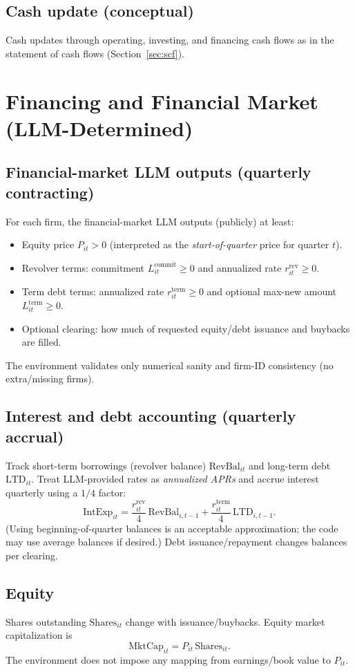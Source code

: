 \documentclass[11pt]{article}
\begin{document}
\subsection{Cash update (conceptual)}
Cash updates through operating, investing, and financing cash flows as in the statement of cash flows (Section~\ref{sec:scf}).

\section{Financing and Financial Market (LLM-Determined)}

\subsection{Financial-market LLM outputs (quarterly contracting)}
For each firm, the financial-market LLM outputs (publicly) at least:
\begin{itemize}[leftmargin=*]
    \item Equity price $P_{it}>0$ (interpreted as the \emph{start-of-quarter} price for quarter $t$).
    \item Revolver terms: commitment $L^{\text{commit}}_{it}\ge 0$ and annualized rate $r^{\text{rev}}_{it}\ge 0$.
    \item Term debt terms: annualized rate $r^{\text{term}}_{it}\ge 0$ and optional max-new amount $L^{\text{term}}_{it}\ge 0$.
    \item Optional clearing: how much of requested equity/debt issuance and buybacks are filled.
\end{itemize}
The environment validates only numerical sanity and firm-ID consistency (no extra/missing firms).

\subsection{Interest and debt accounting (quarterly accrual)}
Track short-term borrowings (revolver balance) $\text{RevBal}_{it}$ and long-term debt $\text{LTD}_{it}$.
Treat LLM-provided rates as \emph{annualized APRs} and accrue interest quarterly using a $1/4$ factor:
\[
\text{IntExp}_{it} = \frac{r^{\text{rev}}_{it}}{4}\,\text{RevBal}_{i,t-1} + \frac{r^{\text{term}}_{it}}{4}\,\text{LTD}_{i,t-1}.
\]
(Using beginning-of-quarter balances is an acceptable approximation; the code may use average balances if desired.)
Debt issuance/repayment changes balances per clearing.

\subsection{Equity}
Shares outstanding $\text{Shares}_{it}$ change with issuance/buybacks. Equity market capitalization is
\[
\text{MktCap}_{it} = P_{it}\,\text{Shares}_{it}.
\]
The environment does not impose any mapping from earnings/book value to $P_{it}$.
\end{document}
